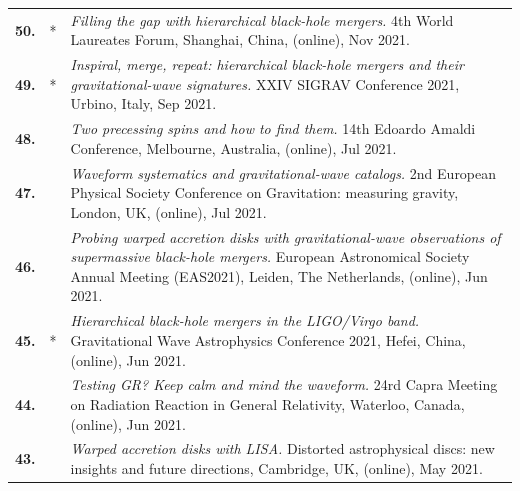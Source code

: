 {\begin{longtable}{rp{0.3cm}p{15.8cm}}
%
\textbf{50.} & * & \textit{Filling the gap with hierarchical black-hole mergers.}
\newline{}
4th World Laureates Forum, Shanghai, China, (online), Nov 2021.
\vspace{0.05cm}\\
%
\textbf{49.} & * & \textit{Inspiral, merge, repeat: hierarchical black-hole mergers and their gravitational-wave signatures.}
\newline{}
XXIV SIGRAV Conference 2021, Urbino, Italy, Sep 2021.
\vspace{0.05cm}\\
%
\textbf{48.} &  & \textit{Two precessing spins and how to find them.}
\newline{}
14th Edoardo Amaldi Conference, Melbourne, Australia, (online), Jul 2021.
\vspace{0.05cm}\\
%
\textbf{47.} &  & \textit{Waveform systematics and gravitational-wave catalogs.}
\newline{}
2nd European Physical Society Conference on Gravitation: measuring gravity, London, UK, (online), Jul 2021.
\vspace{0.05cm}\\
%
\textbf{46.} &  & \textit{Probing warped accretion disks with gravitational-wave observations of supermassive black-hole mergers.}
\newline{}
European Astronomical Society Annual Meeting (EAS2021), Leiden, The Netherlands, (online), Jun 2021.
\vspace{0.05cm}\\
%
\textbf{45.} & * & \textit{Hierarchical black-hole mergers in the LIGO/Virgo band.}
\newline{}
Gravitational Wave Astrophysics Conference 2021, Hefei, China, (online), Jun 2021.
\vspace{0.05cm}\\
%
\textbf{44.} &  & \textit{Testing GR? Keep calm and mind the waveform.}
\newline{}
24rd Capra Meeting on Radiation Reaction in General Relativity, Waterloo, Canada, (online), Jun 2021.
\vspace{0.05cm}\\
%
\textbf{43.} &  & \textit{Warped accretion disks with LISA.}
\newline{}
Distorted astrophysical discs: new insights and future directions, Cambridge, UK, (online), May 2021.
\vspace{0.05cm}\\

\end{longtable}}
